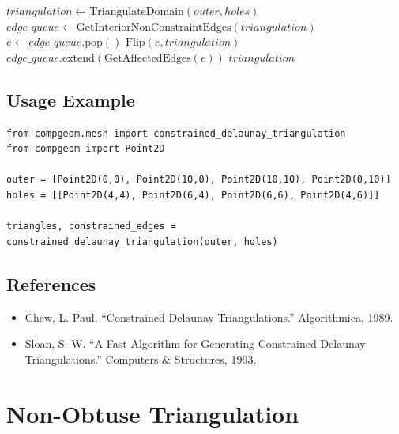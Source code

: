 \begin{algorithm}[htbp]
\caption{Constrained Delaunay Triangulation}
\label{alg:cdt}
\begin{algorithmic}[1]
  \State $triangulation \gets \text{TriangulateDomain}(outer, holes)$
  \State $edge\_queue \gets \text{GetInteriorNonConstraintEdges}(triangulation)$
    \State $e \gets edge\_queue.\text{pop}()$
      \State $\text{Flip}(e, triangulation)$
      \State $edge\_queue.\text{extend}(\text{GetAffectedEdges}(e))$
    \EndIf
  \EndWhile
  \State \Return $triangulation$
\EndFunction
\end{algorithmic}
\end{algorithm}

\subsection{Usage Example}

\begin{verbatim}
from compgeom.mesh import constrained_delaunay_triangulation
from compgeom import Point2D

outer = [Point2D(0,0), Point2D(10,0), Point2D(10,10), Point2D(0,10)]
holes = [[Point2D(4,4), Point2D(6,4), Point2D(6,6), Point2D(4,6)]]

triangles, constrained_edges = constrained_delaunay_triangulation(outer, holes)
\end{verbatim}

\subsection{References}

\begin{itemize}
\item Chew, L. Paul. ``Constrained Delaunay Triangulations.'' Algorithmica, 1989.
\item Sloan, S. W. ``A Fast Algorithm for Generating Constrained Delaunay Triangulations.'' Computers \& Structures, 1993.
\end{itemize}


\section{Non-Obtuse Triangulation}
\label{sec:non_obtuse_triangulation}

